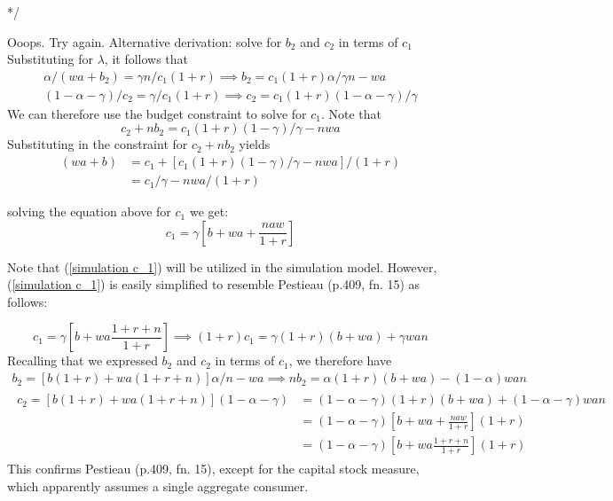 \documentclass{article}
\begin{document}
*/


Ooops.  Try again.
Alternative derivation: solve for $b_{2}$ and $c_{2}$ in terms of $c_{1}$\\
Substituting for $\lambda$, it follows that
\begin{gather}
\alpha/(wa+b_{2}) = \gamma n/ c_{1} (1+r) \implies b_{2} = c_{1} (1+r) \alpha /\gamma n - wa
\\
(1-\alpha-\gamma)/ c_{2} = \gamma / c_{1} (1+r)  \implies  c_{2} = c_{1}(1+r) (1-\alpha-\gamma)/\gamma
\end{gather}
We can therefore use the budget constraint to solve for $c_{1}$.
Note that
\begin{equation}
c_{2} + n b_{2} = c_{1}(1+r)(1-\gamma)/\gamma - nwa
\end{equation}
Substituting in the constraint for $c_{2} + n b_{2}$ yields
\begin{equation}
\begin{split}
(w a + b)
&= c_{1} + [c_{1}(1+r)(1-\gamma)/\gamma - nwa]/(1+r)
\\
&= c_{1}/\gamma - nwa/(1+r)
\end{split}
\end{equation}

solving the equation above for $c_{1}$ we get:
\begin{equation}\label{simulation c_1}
c_{1} = \gamma[b + wa + \frac{naw}{1+r}]
\end{equation}

Note that (\ref{simulation c_1}) will be utilized in the simulation model.  However, (\ref{simulation c_1}) is easily simplified to resemble Pestieau (p.409, fn. 15) as follows:

\begin{equation}
c_{1} = \gamma[b + wa\frac{1+r+n} {1+r}] \implies
(1+r)c_{1} = \gamma(1+r)(b + wa) + \gamma wan
\end{equation}
Recalling that we expressed $b_{2}$ and $c_{2}$ in terms of $c_{1}$, we therefore have
\begin{gather}
b_{2} =  [b(1+r) + wa(1+r+n)] \alpha /n - wa \implies nb_{2} = \alpha(1+r)(b+wa) - (1-\alpha)wan
\\
\begin{split}
c_{2} = [b(1+r) + wa(1+r+n)] (1-\alpha-\gamma) &= (1-\alpha-\gamma)(1+r)(b+wa) + (1-\alpha-\gamma)wan
\\
&= (1-\alpha -\gamma)[b+wa+\frac{naw}{1+r}](1+r)
\\
&= (1-\alpha -\gamma)[b+wa\frac{1+r+n}{1+r}](1+r)
\end{split}
\end{gather}
This confirms Pestieau (p.409, fn. 15), except for the capital stock measure,
which apparently assumes a single aggregate consumer.\newline
\end{document}
